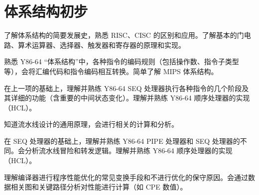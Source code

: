 \chapter{体系结构初步}\thispagestyle{empty}
    \begin{summary}
        \begin{compactitem}
            \item 了解体系结构的简要发展史，熟悉 RISC、CISC 的区别和应用。了解基本的门电路、算术运算器、选择器、触发器和寄存器的原理和实现。
            \item 熟悉 Y86-64 “体系结构”中，各种指令的编码规则（包括操作数、指令子类型等），会将汇编代码和指令编码相互转换。简单了解 MIPS 体系结构。
            \item 在上一项的基础上，理解并熟练 Y86-64 SEQ 处理器执行各种指令的几个阶段及其详细的功能（含重要的中间状态变化）。理解并熟练 Y86-64 顺序处理器的实现（HCL）。
            \item 知道流水线设计的通用原理，会进行相关的计算和分析。
            \item 在 SEQ 处理器的基础上，理解并熟练 Y86-64 PIPE 处理器和 SEQ 处理器的不同。会分析流水线冒险和转发逻辑。理解并熟练 Y86-64 顺序处理器的实现（HCL）。
            \item 理解编译器进行程序性能优化的常见变换手段和不进行优化的保守原因。会通过数据相关图和关键路径分析对性能进行计算（如 CPE 数值）。
        \end{compactitem}
    \end{summary}

